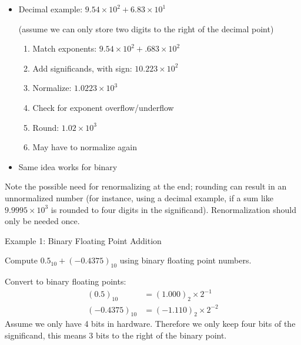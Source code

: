 \begin{frame}[fragile]
\begin{itemize}
\item Decimal example: $9.54 \times 10^2 + 6.83 \times 10^1$

(assume we can only store two digits to the right of the decimal point)
\begin{enumerate}
\item Match exponents: $9.54 \times 10^2 + .683 \times 10^2$
\item Add significands, with sign: $10.223 \times 10^2$
\item Normalize: $1.0223 \times 10^3$
\item Check for exponent overflow/underflow
\item Round: $1.02 \times 10^3$
\item May have to normalize again
\end{enumerate}
\item Same idea works for binary
\end{itemize}
\BNotes\ifnum{}
Note the possible need for renormalizing at the end;
rounding can result in an unnormalized number (for instance, using a
decimal example, if a sum like $9.9995 \times 10^3$ is rounded to four
digits in the significand). Renormalization should only be needed
once.
\fi\ENotes
\end{frame}

\begin{frame}{Example 1: Binary Floating Point Addition}
       \begin{tcolorbox}[enhanced,attach boxed title to top center={yshift=-3mm,yshifttext=-1mm},
  colback=red!5!white,colframe=red!75!black,colbacktitle=red!80!black,
  title=Try this,fonttitle=\bfseries,
  boxed title style={size=small,colframe=red!50!black} ]
Compute $0.5_{10} + (-0.4375)_{10}$ using binary floating point numbers. 
  \end{tcolorbox}
Convert to binary floating points: 
\begin{align*}
(0.5)_{10}&=(1.000)_2 \times 2^{-1}\\
(-0.4375)_{10}&=(-1.110)_2 \times 2^{-2}
\end{align*}
Assume we only have 4 bits in hardware. Therefore we only keep four bits of the significand, this means 3 bits to the right of the binary point.  
\end{frame}

